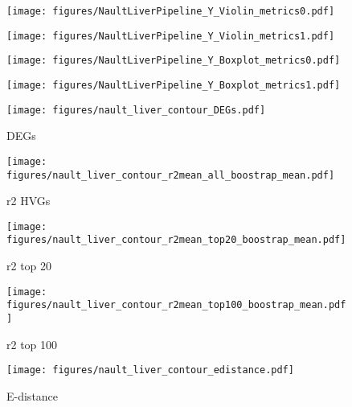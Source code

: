 \clearpage

\begin{figure}[h!]
    \centering
    \texttt{[image: figures/NaultLiverPipeline\_Y\_Violin\_metrics0.pdf]}
\end{figure}

\begin{figure}[h!]
    \centering
    \texttt{[image: figures/NaultLiverPipeline\_Y\_Violin\_metrics1.pdf]}
\end{figure}

\clearpage

\begin{figure}[h!]
    \centering
    \texttt{[image: figures/NaultLiverPipeline\_Y\_Boxplot\_metrics0.pdf]}
\end{figure}

\begin{figure}[h!]
    \centering
    \texttt{[image: figures/NaultLiverPipeline\_Y\_Boxplot\_metrics1.pdf]}
\end{figure}

\clearpage

\begin{figure}[h!]
    \centering
    \texttt{[image: figures/nault\_liver\_contour\_DEGs.pdf]}
    \caption{DEGs}
\end{figure}

\begin{figure}[h!]
    \centering
    \texttt{[image: figures/nault\_liver\_contour\_r2mean\_all\_boostrap\_mean.pdf]}
    \caption{r2 HVGs}
\end{figure}

\clearpage

\begin{figure}[h!]
    \centering
    \texttt{[image: figures/nault\_liver\_contour\_r2mean\_top20\_boostrap\_mean.pdf]}
    \caption{r2 top 20}
\end{figure}

\begin{figure}[h!]
    \centering
    \texttt{[image: figures/nault\_liver\_contour\_r2mean\_top100\_boostrap\_mean.pdf]}
    \caption{r2 top 100}
\end{figure}

\clearpage

\begin{figure}[h!]
    \centering
    \texttt{[image: figures/nault\_liver\_contour\_edistance.pdf]}
    \caption{E-distance}
\end{figure}

